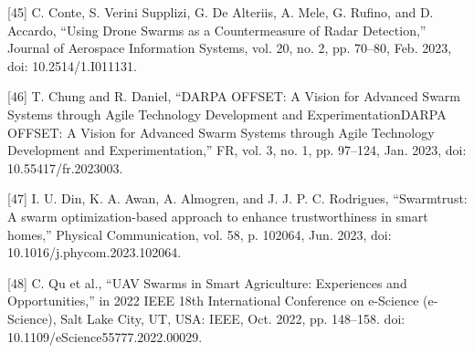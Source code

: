 [45] C. Conte, S. Verini Supplizi, G. De Alteriis, A. Mele, G. Rufino, and D. Accardo, “Using Drone Swarms as a Countermeasure of Radar Detection,” Journal of Aerospace Information Systems, vol. 20, no. 2, pp. 70–80, Feb. 2023, doi: 10.2514/1.I011131.


[46] T. Chung and R. Daniel, “DARPA OFFSET: A Vision for Advanced Swarm Systems through Agile Technology Development and ExperimentationDARPA OFFSET: A Vision for Advanced Swarm Systems through Agile Technology Development and Experimentation,” FR, vol. 3, no. 1, pp. 97–124, Jan. 2023, doi: 10.55417/fr.2023003.


[47] I. U. Din, K. A. Awan, A. Almogren, and J. J. P. C. Rodrigues, “Swarmtrust: A swarm optimization-based approach to enhance trustworthiness in smart homes,” Physical Communication, vol. 58, p. 102064, Jun. 2023, doi: 10.1016/j.phycom.2023.102064.


[48] C. Qu et al., “UAV Swarms in Smart Agriculture: Experiences and Opportunities,” in 2022 IEEE 18th International Conference on e-Science (e-Science), Salt Lake City, UT, USA: IEEE, Oct. 2022, pp. 148–158. doi: 10.1109/eScience55777.2022.00029.